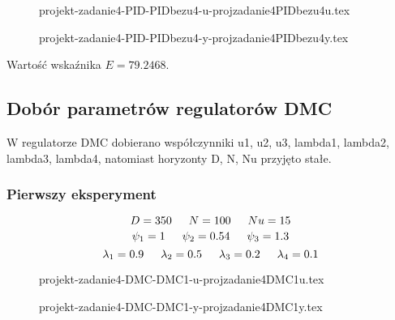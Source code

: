 \ifdefined\CompileFigures
    \begin{figure}[H] 
        \centering
        
        \caption{projekt-zadanie4-PID-PIDbezu4-u-projzadanie4PIDbezu4u.tex}
        \label{projekt:zad4:figure:projzadanie4PIDbezu4u}
    \end{figure}
\fi

\ifdefined\CompileFigures
    \begin{figure}[H] 
        \centering
        
        \caption{projekt-zadanie4-PID-PIDbezu4-y-projzadanie4PIDbezu4y.tex}
        \label{projekt:zad4:figure:projzadanie4PIDbezu4y}
    \end{figure}
\fi
Wartość wskaźnika $E=\num{79.2468}$.

\subsection{Dobór parametrów regulatorów DMC}

W regulatorze DMC dobierano współczynniki u1, u2, u3, lambda1, lambda2, lambda3, lambda4, natomiast horyzonty
D, N, Nu przyjęto stałe.

\subsubsection{Pierwszy eksperyment}

$$D=350 \indent  N=100 \indent  Nu=15$$ 
$$\psi_1=\num{1} \indent \psi_2=\num{0.54} \indent \psi_3=\num{1.3}$$
$$\lambda_1=\num{0.9} \indent \lambda_2=\num{0.5} \indent \lambda_3=\num{0.2} \indent \lambda_4=\num{0.1}$$

\ifdefined\CompileFigures
    \begin{figure}[H] 
        \centering
        
        \caption{projekt-zadanie4-DMC-DMC1-u-projzadanie4DMC1u.tex}
        \label{projekt:zad4:figure:projzadanie4DMC1u}
    \end{figure}
\fi

\ifdefined\CompileFigures
    \begin{figure}[H] 
        \centering
        
        \caption{projekt-zadanie4-DMC-DMC1-y-projzadanie4DMC1y.tex}
        \label{projekt:zad4:figure:projzadanie4DMC1y}
    \end{figure}
\fi

